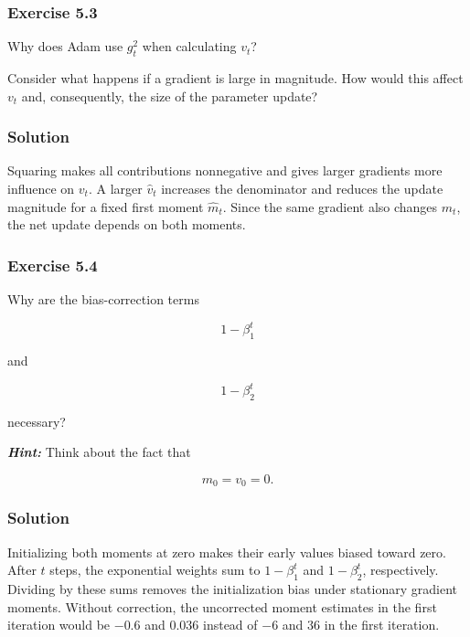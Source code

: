 \documentclass[10pt]{article}
\begin{document}
\par\endgroup

\subsubsection*{Exercise 5.3}
Why does Adam use $g_t^2$ when calculating $v_t$?

Consider what happens if a gradient is large in magnitude. How would this affect $v_t$ and, consequently, the size of the parameter update?

\begingroup\color{red}

\subsubsection*{Solution}
Squaring makes all contributions nonnegative and gives larger gradients more influence on $v_t$. A larger $\hat v_t$ increases the denominator and reduces the update magnitude for a fixed first moment $\hat m_t$. Since the same gradient also changes $m_t$, the net update depends on both moments.

\par\endgroup

\subsubsection*{Exercise 5.4}
Why are the bias-correction terms

\[
1-\beta_1^t
\]

and

\[
1-\beta_2^t
\]

necessary?

\textbf{\textit{Hint:}} Think about the fact that

\[
m_0=v_0=0.
\]

\begingroup\color{red}

\subsubsection*{Solution}
Initializing both moments at zero makes their early values biased toward zero. After $t$ steps, the exponential weights sum to $1-\beta_1^t$ and $1-\beta_2^t$, respectively. Dividing by these sums removes the initialization bias under stationary gradient moments. Without correction, the uncorrected moment estimates in the first iteration would be $-0.6$ and $0.036$ instead of $-6$ and $36$ in the first iteration.

\par\endgroup
\end{document}
